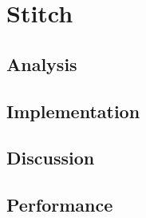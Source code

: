 \chapter{Stitch}
\section{Analysis} %
\section{Implementation} %
\section{Discussion} %
\section{Performance} %

